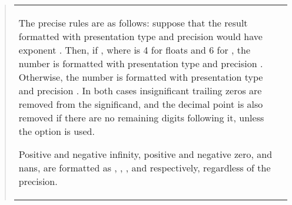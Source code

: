 \documentclass[letterpaper,10pt,english]{sphinxmanual}
\begin{document}
\begin{quote}
\begin{savenotes}
\begin{tabulary}{\linewidth}[t]{|T|T|}
The precise rules are as follows: suppose that the
result formatted with presentation type  and
precision  would have exponent .  Then,
if , where  is \sphinxhyphen{}4 for floats and \sphinxhyphen{}6
for , the number is
formatted with presentation type  and precision
.  Otherwise, the number is formatted
with presentation type  and precision .
In both cases insignificant trailing zeros are removed
from the significand, and the decimal point is also
removed if there are no remaining digits following it,
unless the \sphinxcode{\sphinxupquote{\textquotesingle{}\#\textquotesingle{}}} option is used.

Positive and negative infinity, positive and negative
zero, and nans, are formatted as , ,
,  and  respectively, regardless of
the precision.


\end{tabulary}
\end{savenotes}
\end{quote}
\end{document}
